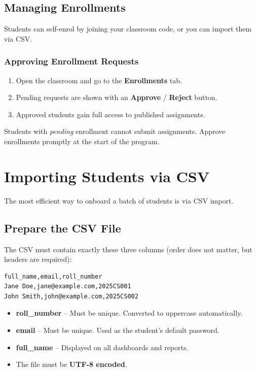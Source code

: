 \documentclass[12pt,a4paper]{article}
\begin{document}
\subsection{Managing Enrollments}

Students can self-enrol by joining your classroom code, or you can import them via CSV.

\subsubsection{Approving Enrollment Requests}

\begin{enumerate}
  \item Open the classroom and go to the \textbf{Enrollments} tab.
  \item Pending requests are shown with an \textbf{Approve} / \textbf{Reject} button.
  \item Approved students gain full access to published assignments.
\end{enumerate}

\begin{warnbox}
  Students with \emph{pending} enrollment cannot submit assignments. Approve enrollments promptly at the start of the program.
\end{warnbox}

\section{Importing Students via CSV}

The most efficient way to onboard a batch of students is via CSV import.

\subsection{Prepare the CSV File}

The CSV must contain exactly these three columns (order does not matter, but headers are required):

\begin{lstlisting}
full_name,email,roll_number
Jane Doe,jane@example.com,2025CS001
John Smith,john@example.com,2025CS002
\end{lstlisting}

\begin{itemize}
  \item \textbf{roll\_number} -- Must be unique. Converted to uppercase automatically.
  \item \textbf{email} -- Must be unique. Used as the student's default password.
  \item \textbf{full\_name} -- Displayed on all dashboards and reports.
  \item The file must be \textbf{UTF-8 encoded}.
\end{itemize}
\end{document}
